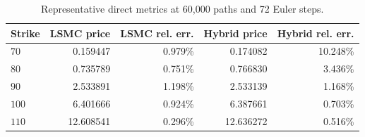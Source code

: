 \begin{table}[htbp]
\centering
\caption{Representative direct metrics at 60,000 paths and 72 Euler steps.}
\label{tab:bgk_r03_v004_t1_delta05_nex12-step72-60k}
\begin{tabular}{lrrrr}
\toprule
Strike & LSMC price & LSMC rel. err. & Hybrid price & Hybrid rel. err. \\
\midrule
$70$ & 0.159447 & 0.979\% & 0.174082 & 10.248\% \\
$80$ & 0.735789 & 0.751\% & 0.766830 & 3.436\% \\
$90$ & 2.533891 & 1.198\% & 2.533139 & 1.168\% \\
$100$ & 6.401666 & 0.924\% & 6.387661 & 0.703\% \\
$110$ & 12.608541 & 0.296\% & 12.636272 & 0.516\% \\
\bottomrule
\end{tabular}
\end{table}
